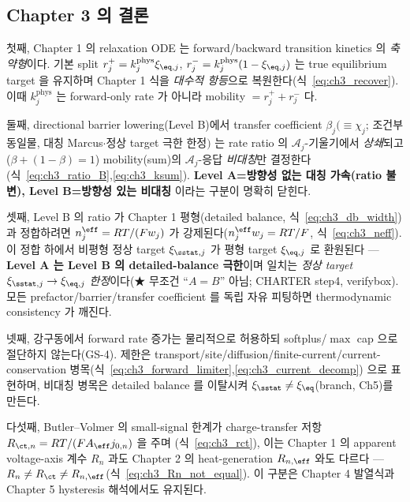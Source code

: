 \subsection{Chapter 3 의 결론}\label{sec:ch3_concl}
첫째, Chapter 1 의 relaxation ODE 는 forward/backward transition kinetics 의 \emph{축약형}이다. 기본 split
$r_j^+=k_j^{\mathrm{phys}}\xi_{\eq,j}$, $r_j^-=k_j^{\mathrm{phys}}(1-\xi_{\eq,j})$ 는 true equilibrium target 을
유지하며 Chapter 1 식을 \emph{대수적 항등}으로 복원한다(식~\eqref{eq:ch3_recover}). 이때 $k_j^{\mathrm{phys}}$ 는
forward-only rate 가 아니라 mobility $=r_j^++r_j^-$ 다.

둘째, directional barrier lowering(Level B)에서 transfer coefficient $\beta_j(\equiv\chi_j$; 조건부 동일물, 대칭 Marcus$\cdot$정상 target 극한 한정$)$ 는 rate ratio 의
$\mathcal A_j$-기울기에서 \emph{상쇄}되고($\beta+(1-\beta)=1$) mobility(sum)의 $\mathcal A_j$-응답 \emph{비대칭}만
결정한다(식~\eqref{eq:ch3_ratio_B},\allowbreak\eqref{eq:ch3_ksum}). \textbf{Level A=방향성 없는 대칭 가속(ratio 불변),
Level B=방향성 있는 비대칭} 이라는 구분이 명확히 닫힌다.

셋째, Level B 의 ratio 가 Chapter 1 평형(detailed balance, 식~\eqref{eq:ch3_db_width})과 정합하려면
$n_j^{\eff}=RT/(Fw_j)$ 가 강제된다($n_j^{\eff}w_j=RT/F$, 식~\eqref{eq:ch3_neff}). 이 정합 하에서 비평형 정상 target
$\xi_{\sstat,j}$ 가 평형 target $\xi_{\eq,j}$ 로 환원된다 — \textbf{Level A 는 Level B 의 detailed-balance 극한}이며
일치는 \emph{정상 target} $\xi_{\sstat,j}\to\xi_{\eq,j}$ \emph{한정}이다(★ 무조건 ``$A=B$'' 아님; CHARTER step4,
verifybox). 모든 prefactor/barrier/transfer coefficient 를 독립 자유 피팅하면 thermodynamic consistency 가 깨진다.

넷째, 강구동에서 forward rate 증가는 물리적으로 허용하되 softplus/$\max$ cap 으로 절단하지 않는다(GS-4). 제한은
transport/site/diffusion/finite-current/current-conservation 병목(식~\eqref{eq:ch3_forward_limiter},\allowbreak\eqref{eq:ch3_current_decomp})
으로 표현하며, 비대칭 병목은 detailed balance 를 이탈시켜 $\xi_{\sstat}\ne\xi_{\eq}$(branch, Ch5)를 만든다.

다섯째, Butler--Volmer 의 small-signal 한계가 charge-transfer 저항 $R_{\ct,n}=RT/(FA_\eff j_{0,n})$ 을 주며
(식~\eqref{eq:ch3_rct}), 이는 Chapter 1 의 apparent voltage-axis 계수 $R_n$ 과도 Chapter 2 의 heat-generation
$R_{n,\eff}$ 와도 다르다 — \textbf{$R_n\ne R_\ct\ne R_{n,\eff}$}(식~\eqref{eq:ch3_Rn_not_equal}). 이 구분은
Chapter 4 발열식과 Chapter 5 hysteresis 해석에서도 유지된다.

